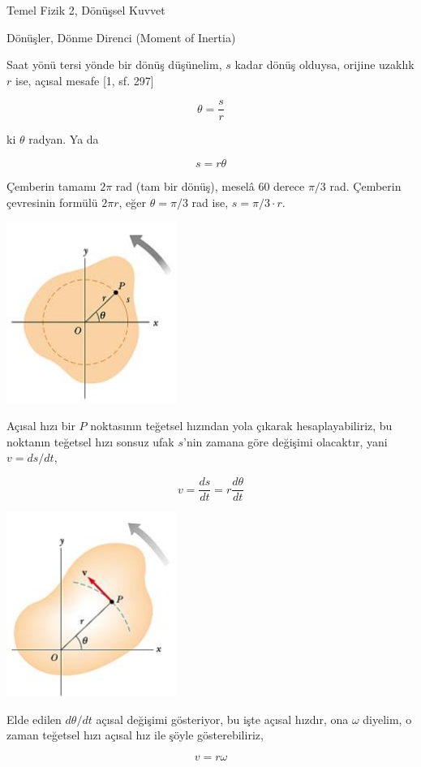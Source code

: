 \documentclass[12pt,fleqn]{article}\usepackage{../../common}
\begin{document}
Temel Fizik 2, Dönüşsel Kuvvet

Dönüşler, Dönme Direnci (Moment of Inertia)

Saat yönü tersi yönde bir dönüş düşünelim, $s$ kadar dönüş olduysa, orijine
uzaklık $r$ ise, açısal mesafe [1, sf. 297]

$$
\theta = \frac{s}{r}
$$

ki $\theta$ radyan. Ya da

$$
s = r \theta
$$

Çemberin tamamı $2\pi$ rad (tam bir dönüş), meselâ 60 derece $\pi / 3$
rad. Çemberin çevresinin formülü $2\pi r$, eğer $\theta = \pi / 3$ rad ise,
$s = \pi / 3 \cdot r $.

\includegraphics[width=15em]{phy_005_basics_02_08.jpg}

Açısal hızı bir $P$ noktasının teğetsel hızından yola çıkarak
hesaplayabiliriz, bu noktanın teğetsel hızı sonsuz ufak $s$'nin zamana göre
değişimi olacaktır, yani $v = ds / dt$, 

$$
v = \frac{ds}{dt} = r \frac{d\theta}{dt}
$$

\includegraphics[width=15em]{phy_005_basics_02_09.jpg}

Elde edilen $d\theta / dt$ açısal değişimi gösteriyor, bu işte açısal
hızdır, ona $\omega$ diyelim, o zaman teğetsel hızı açısal hız ile şöyle
gösterebiliriz,

$$
v = r\omega
$$
\end{document}

